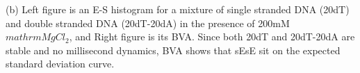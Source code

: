 \label{fig:bva_static}(b) Left figure is an E-S histogram for a mixture of single stranded DNA (20dT) and double stranded DNA (20dT-20dA) in the presence of 200mM $mathrm{MgCl_2}$, and Right figure is its BVA. Since both 20dT and 20dT-20dA are stable and no millisecond dynamics, BVA shows that sEsE sit on the expected standard deviation curve.